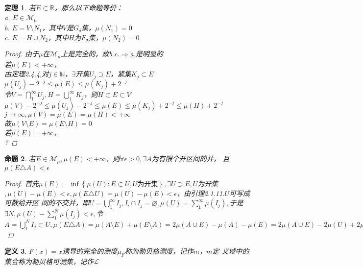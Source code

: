 \documentclass[12pt, a4paper, oneside]{ctexbook}
\newtheorem{theorem}{定理}[section]
\newtheorem{definition}[theorem]{定义}
\newtheorem{proposition}[theorem]{命题}
\begin{document}
\begin{theorem}
    若$E\subset\mathbb{R}$，那么以下命题等价：\\
    a. $E\in\mathcal{M}_{\mu}$\\
    b. $E=V\setminus N_1$，其中$V$是$G_{\delta}$集，$\mu(N_1)=0$\\
    c. $E=H\cup N_2$，其中$H$为$F_{\sigma}$集，$\mu(N_2)=0$
    \begin{proof}
        由于$\mu$在$\mathcal{M}_{\mu}$上是完全的，故b.c.$\Rightarrow$a.是明显的\\
        若$\mu(E)<+\infty$，\\
        由定理2.4.4,对$j\in\mathbb{N}$，$\exists$开集$U_j\supset E$，紧集$K_j\subset E$\\
        $\mu(U_j)-2^{-j}\leq\mu(E)\leq\mu(K_j)+2^{-j}$\\
        令$V=\bigcap_1^{\infty}U_j,H=\bigcup_1^{\infty}K_j$，则$H\subset E\subset V$\\
        $\mu(V)-2^{-j}\leq\mu(U_j)-2^{-j}\leq\mu(E)\leq\mu(K_j)+2^{-j}\leq\mu(H)+2^{-j}$\\
        $j\to\infty,\mu(V)=\mu(E)=\mu(H)<+\infty$\\
        故$\mu(V\setminus E)=\mu(E\setminus H)=0$\\
        若$\mu(E)=+\infty$，\\
        ?
    \end{proof}
\end{theorem}
\begin{proposition}
    若$E\in\mathcal{M}_{\mu},\mu(E)<+\infty$，则$\forall\epsilon>0,\exists A$为有限个开区间的并，
    且$\mu(E\triangle A)<\epsilon$
    \begin{proof}
        首先$\mu(E)=\inf\left\{\mu(U):E\subset U,U\text{为开集}\right\},\exists U\supset E,U$为开集$,\mu(U)-
        \mu(E)<\epsilon,\mu(E\triangle U)=\mu(U)-\mu(E)<\epsilon$，由引理2.1.11.$U$可写成可数给开区
        间的不交并，即$U=\bigcup_1^{\infty}I_j,I_i\cap I_j=\varnothing,\mu(U)=\sum_1^{\infty}\mu(I_j),$于是$\exists N,\mu(U)-
        \sum_1^N\mu(I_j)<\epsilon,$令$A=\bigcup_1^NI_j\subset U,\mu(E\triangle A)=\mu(A\setminus E)+\mu(E\setminus A)=2\mu(A\cup 
        E)-\mu(A)-\mu(E)=2\mu(A\cup E)-2\mu(U)+2\mu(U)-\mu(A)-\mu(E)<2\mu(A\cup 
        E)-2\mu(U)+2\epsilon\leq 2\epsilon$
    \end{proof}
\end{proposition}
\begin{definition}
    $F(x)=x$诱导的完全的测度$\mu_{F}$称为勒贝格测度，记作$m$，$m$定
    义域中的集合称为勒贝格可测集，记作$\mathcal{L}$
\end{definition}
\end{document}
